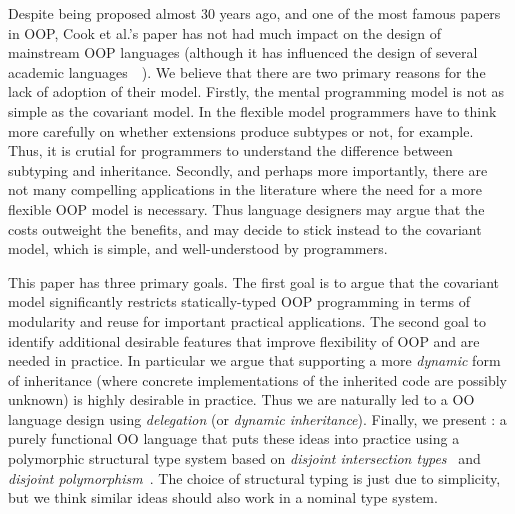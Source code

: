 \begin{comment}
\begin{itemize}

\item {\bf Inheritance and subtyping should be decoupled:} 
That is, there should be different mechanisms for class inheritance 
and class/interface subtyping. 

\item {\bf Extensions do not always produce subtypes:} 
There are cases where classes can inherit from other classes without 
producing subtypes. 

\end{itemize}

\end{comment}

Despite being proposed almost 30 years ago, and one of the most
famous papers in OOP, Cook et al.'s paper has not had much impact 
on the design of mainstream OOP languages (although it has influenced 
the design of several academic languages~\cite{}~).
We believe that there are two primary reasons for the lack of adoption
of their model.  Firstly, the mental programming model is not
as simple as the covariant model. In the flexible model programmers have to
think more carefully on whether extensions produce subtypes or not,
for example.  Thus, it is crutial for programmers to understand the
difference between subtyping and inheritance.
Secondly, and perhaps more importantly, there are not many compelling applications in
the literature where the need for a more flexible OOP model is
necessary. Thus language designers may argue that the costs outweight 
the benefits, and may decide to stick instead to the covariant 
model, which is simple, and well-understood by programmers. 

This paper has three primary goals. The first goal is to argue that the
covariant model significantly restricts statically-typed OOP programming in
terms of modularity and reuse for important practical applications. The second
goal to identify additional desirable features that improve flexibility of OOP
and are needed in practice. In particular we argue that supporting a more
\emph{dynamic} form of inheritance (where concrete implementations of the
inherited code are possibly unknown) is highly desirable in practice. Thus we
are naturally led to a OO language design using \emph{delegation} (or
\emph{dynamic inheritance}). Finally, we present \name: a purely functional OO
language that puts these ideas into practice using a polymorphic structural type
system based on \emph{disjoint intersection types}~\cite{oliveira2016disjoint}
and \emph{disjoint polymorphism}~\cite{alpuimdisjoint}. The choice of structural
typing is just due to simplicity, but we think similar ideas should also work
in a nominal type system.

